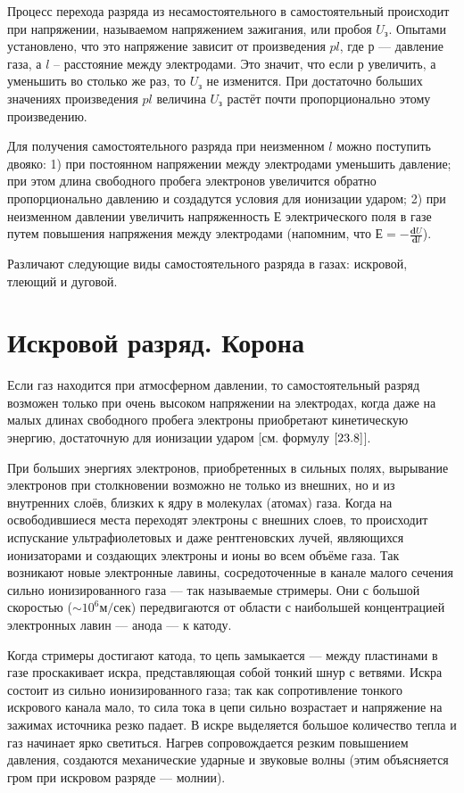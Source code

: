 \documentclass[a4paper,10pt]{book}
\begin{document}
Процесс перехода разряда из несамостоятельного в самостоятельный происходит при напряжении, называемом напряжением зажигания, или пробоя $U_\text{з}$. Опытами установлено, что это напряжение зависит от произведения $pl$, где $р$ — давление газа, а $l$ -- расстояние между электродами. Это значит, что если $р$ увеличить, а  уменьшить во столько же раз, то $U_\text{з}$ не изменится. При достаточно больших значениях произведения $pl$ величина $U_\text{з}$ растёт почти пропорционально этому произведению.

Для получения самостоятельного разряда при неизменном $l$ можно поступить двояко:
1)	при постоянном напряжении между электродами уменьшить давление; при этом длина свободного пробега электронов увеличится обратно пропорционально давлению и создадутся условия для ионизации ударом;
2)	при неизменном давлении увеличить напряженность $Е$ электрического поля в газе путем повышения напряжения между электродами (напомним, что $Е = -\frac{\mathbf{d}U}{\mathbf{d}l}$).

Различают следующие виды самостоятельного разряда в газах: искровой, тлеющий и дуговой.

\section{Искровой разряд. Корона}

Если газ находится при атмосферном давлении, то самостоятельный разряд возможен только при очень высоком напряжении на электродах, когда даже на малых длинах свободного пробега электроны приобретают кинетическую энергию, достаточную для ионизации ударом [см. формулу $\ref{23.8}$].

При больших энергиях электронов, приобретенных в сильных полях, вырывание электронов при столкновении возможно не только из внешних, но и из внутренних слоёв, близких к ядру в молекулах (атомах) газа. Когда на освободившиеся места переходят электроны с внешних слоев, то происходит испускание ультрафиолетовых и даже рентгеновских лучей, являющихся ионизаторами и создающих электроны и ионы во всем объёме газа. Так возникают новые электронные лавины, сосредоточенные в канале малого сечения сильно ионизированного газа — так называемые стримеры. Они с большой скоростью ($\sim 10^6 \textit{м/сек}$) передвигаются от области с наибольшей концентрацией электронных лавин — анода — к катоду.

Когда стримеры достигают катода, то цепь замыкается — между пластинами в газе проскакивает искра, представляющая собой тонкий шнур с ветвями. Искра состоит из сильно ионизированного газа; так как сопротивление тонкого искрового канала мало, то сила тока в цепи сильно возрастает и напряжение на зажимах источника резко падает. В искре выделяется большое количество тепла и газ начинает ярко светиться. Нагрев сопровождается резким повышением давления, создаются механические ударные и звуковые волны (этим объясняется гром при искровом разряде — молнии).
\end{document}
